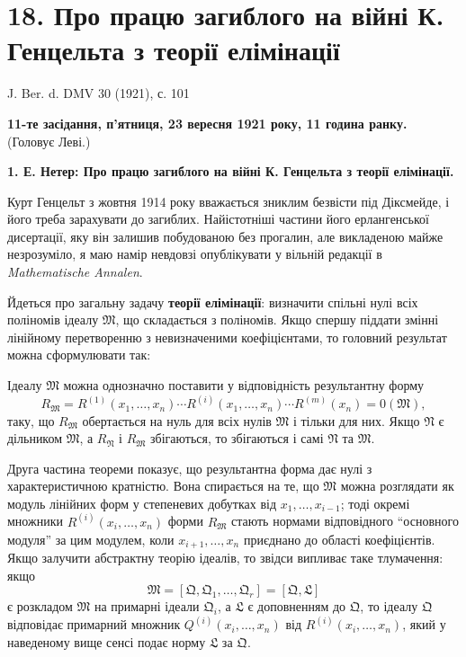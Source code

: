 \documentclass[11pt]{article}
\begin{document}

\setcounter{footnote}{0}
\section*{18. Про працю загиблого на війні К. Генцельта з теорії елімінації}
\begin{center}
J. Ber. d. DMV 30 (1921), с. 101
\end{center}

\begin{center}
\textbf{11-те засідання, п'ятниця, 23 вересня 1921 року, 11 година ранку.}\\
(Головує Леві.)
\end{center}

\textbf{1. Е. Нетер: Про працю загиблого на війні К. Генцельта з теорії елімінації.}

Курт Генцельт з жовтня 1914 року вважається зниклим безвісти під Діксмейде, і його треба зарахувати до загиблих. Найістотніші частини його ерлангенської дисертації, яку він залишив побудованою без прогалин, але викладеною майже незрозуміло, я маю намір невдовзі опублікувати у вільній редакції в \emph{Mathematische Annalen}.

Йдеться про загальну задачу \textbf{теорії елімінації}: визначити спільні нулі всіх поліномів ідеалу \(\mathfrak M\), що складається з поліномів. Якщо спершу піддати змінні лінійному перетворенню з невизначеними коефіцієнтами, то головний результат можна сформулювати так:

Ідеалу \(\mathfrak M\) можна однозначно поставити у відповідність результантну форму
\[
 R_{\mathfrak M}=R^{(1)}(x_1,
\ldots,x_n)\cdots R^{(i)}(x_1,
\ldots,x_n)\cdots R^{(m)}(x_n)=0(\mathfrak M),
\]
таку, що \(R_{\mathfrak M}\) обертається на нуль для всіх нулів \(\mathfrak M\) і тільки для них. Якщо \(\mathfrak N\) є дільником \(\mathfrak M\), а \(R_{\mathfrak N}\) і \(R_{\mathfrak M}\) збігаються, то збігаються і самі \(\mathfrak N\) та \(\mathfrak M\).

Друга частина теореми показує, що результантна форма дає нулі з характеристичною кратністю. Вона спирається на те, що \(\mathfrak M\) можна розглядати як модуль лінійних форм у степеневих добутках від \(x_1,
\ldots,x_{i-1}\); тоді окремі множники \(R^{(i)}(x_i,
\ldots,x_n)\) форми \(R_{\mathfrak M}\) стають нормами відповідного ``основного модуля'' за цим модулем, коли \(x_{i+1},
\ldots,x_n\) приєднано до області коефіцієнтів. Якщо залучити абстрактну теорію ідеалів, то звідси випливає таке тлумачення: якщо
\[
 \mathfrak M=[\mathfrak Q,\mathfrak Q_1,
\ldots,
\mathfrak Q_r]=[\mathfrak Q,\mathfrak L]
\]
є розкладом \(\mathfrak M\) на примарні ідеали \(\mathfrak Q_i\), а \(\mathfrak L\) є доповненням до \(\mathfrak Q\), то ідеалу \(\mathfrak Q\) відповідає примарний множник \(Q^{(i)}(x_i,
\ldots,x_n)\) від \(R^{(i)}(x_i,
\ldots,x_n)\), який у наведеному вище сенсі подає норму \(\mathfrak L\) за \(\mathfrak Q\).

\clearpage
\end{document}
